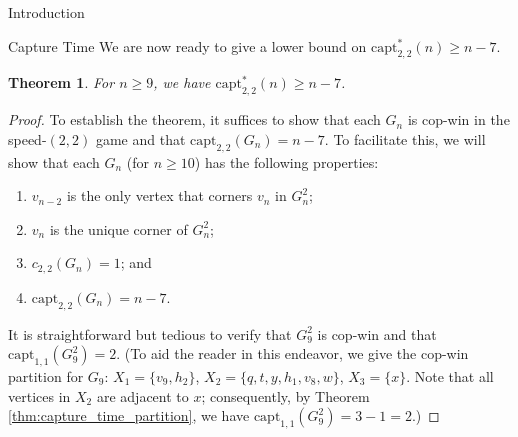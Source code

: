 \documentclass[12pt]{amsart}
\newtheorem{theorem}[lemma]{Theorem}
\theoremstyle{definition}
\newcommand{\speed}[1]{c_{#1,#1}}
\newcommand{\capt}[1]{\mathrm{capt}_{#1,#1}}
\begin{document}
\begin{section}{Introduction}
\begin{section}{Capture Time}
We are now ready to give a lower bound on $\capt{2}^*(n) \ge n-7$.

\begin{theorem}\label{thm:capture_time_speed2}
    For $n \ge 9$, we have $\capt{2}^*(n) \ge n-7$.
\end{theorem}
\begin{proof}
    To establish the theorem, it suffices to show that each $G_n$ is cop-win in the speed-$(2,2)$ game and that $\capt{2}(G_n) = n-7$.  To facilitate this, we will show that each $G_n$ (for $n \ge 10$) has the following properties:
\begin{enumerate}
    \item
        $v_{n-2}$ is the only vertex that corners $v_n$ in $G_n^2$;
    \item
        $v_n$ is the unique corner of $G_n^2$;
    \item
        $\speed{2}(G_n)=1$; and
    \item
        $\capt{2}(G_n)=n-7$.
\end{enumerate}

It is straightforward but tedious to verify that $G_9^2$ is cop-win and that $\mathrm{capt}_{1,1}(G_9^2)=2$.  (To aid the reader in this endeavor, we give the cop-win partition for $G_9$: $X_1=\{v_9,h_2\}$, $X_2=\{q,t,y,h_1,v_8,w\}$, $X_3=\{x\}$.  Note that all vertices in $X_2$ are adjacent to $x$; consequently, by Theorem \ref{thm:capture_time_partition}, we have $\mathrm{capt}_{1,1}(G_9^2)=3-1=2$.)



\end{proof}
\end{section}
\end{section}
\end{document}
